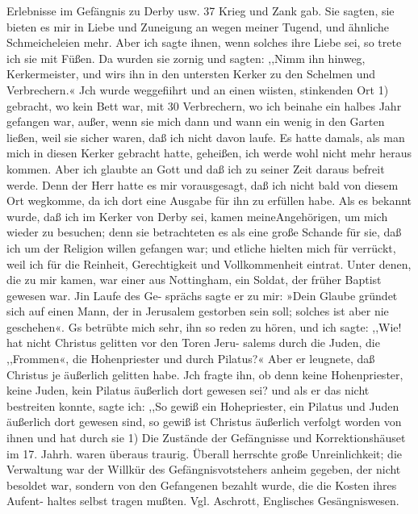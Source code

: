 Erlebnisse im Gefängnis zu Derby usw. 37
Krieg und Zank gab. Sie sagten, sie bieten es mir in Liebe und
Zuneigung an wegen meiner Tugend, und ähnliche Schmeicheleien
mehr. Aber ich sagte ihnen, wenn solches ihre Liebe sei, so trete
ich sie mit Füßen. Da wurden sie zornig und sagten: ,,Nimm
ihn hinweg, Kerkermeister, und wirs ihn in den untersten Kerker
zu den Schelmen und Verbrechern.« Jch wurde weggefiihrt und
an einen wiisten, stinkenden Ort 1) gebracht, wo kein Bett war,
mit 30 Verbrechern, wo ich beinahe ein halbes Jahr gefangen
war, außer, wenn sie mich dann und wann ein wenig in den
Garten ließen, weil sie sicher waren, daß ich nicht davon laufe.
Es hatte damals, als man mich in diesen Kerker gebracht hatte,
geheißen, ich werde wohl nicht mehr heraus kommen. Aber ich
glaubte an Gott und daß ich zu seiner Zeit daraus befreit werde.
Denn der Herr hatte es mir vorausgesagt, daß ich nicht bald
von diesem Ort wegkomme, da ich dort eine Ausgabe für ihn zu
erfüllen habe.
Als es bekannt wurde, daß ich im Kerker von Derby sei, kamen
meineAngehörigen, um mich wieder zu besuchen; denn sie betrachteten
es als eine große Schande für sie, daß ich um der Religion
willen gefangen war; und etliche hielten mich für verrückt, weil
ich für die Reinheit, Gerechtigkeit und Vollkommenheit eintrat.
Unter denen, die zu mir kamen, war einer aus Nottingham,
ein Soldat, der früher Baptist gewesen war. Jin Laufe des Ge-
sprächs sagte er zu mir: »Dein Glaube gründet sich auf einen
Mann, der in Jerusalem gestorben sein soll; solches ist aber nie
geschehen«. Gs betrübte mich sehr, ihn so reden zu hören, und
ich sagte: ,,Wie! hat nicht Christus gelitten vor den Toren Jeru-
salems durch die Juden, die ,,Frommen«, die Hohenpriester und
durch Pilatus?« Aber er leugnete, daß Christus je äußerlich
gelitten habe. Jch fragte ihn, ob denn keine Hohenpriester, keine
Juden, kein Pilatus äußerlich dort gewesen sei? und als er das
nicht bestreiten konnte, sagte ich: ,,So gewiß ein Hohepriester,
ein Pilatus und Juden äußerlich dort gewesen sind, so gewiß ist
Christus äußerlich verfolgt worden von ihnen und hat durch sie
1) Die Zustände der Gefängnisse und Korrektionshäuset im 17. Jahrh.
waren überaus traurig. Überall herrschte große Unreinlichkeit; die Verwaltung
war der Willkür des Gefängnisvotstehers anheim gegeben, der nicht besoldet
war, sondern von den Gefangenen bezahlt wurde, die die Kosten ihres Aufent-
haltes selbst tragen mußten. Vgl. Aschrott, Englisches Gesängniswesen.


